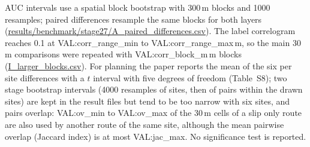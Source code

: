 AUC intervals use a spatial block bootstrap with 300\,m blocks and 1000 resamples; paired differences resample the same blocks for both layers (\url{results/benchmark/stage27/A_paired_differences.csv}). The label correlogram reaches 0.1 at {{VAL:corr_range_min}} to {{VAL:corr_range_max}}\,m, so the main 30\,m comparisons were repeated with {{VAL:corr_block_m}}\,m blocks (\url{I_larger_blocks.csv}). For planning the paper reports the mean of the six per site differences with a $t$ interval with five degrees of freedom (Table~S8); two stage bootstrap intervals (4000 resamples of sites, then of pairs within the drawn sites) are kept in the result files but tend to be too narrow with six sites, and pairs overlap: {{VAL:ov_min}} to {{VAL:ov_max}} of the 30\,m cells of a slip only route are also used by another route of the same site, although the mean pairwise overlap (Jaccard index) is at most {{VAL:jac_max}}. No significance test is reported.
